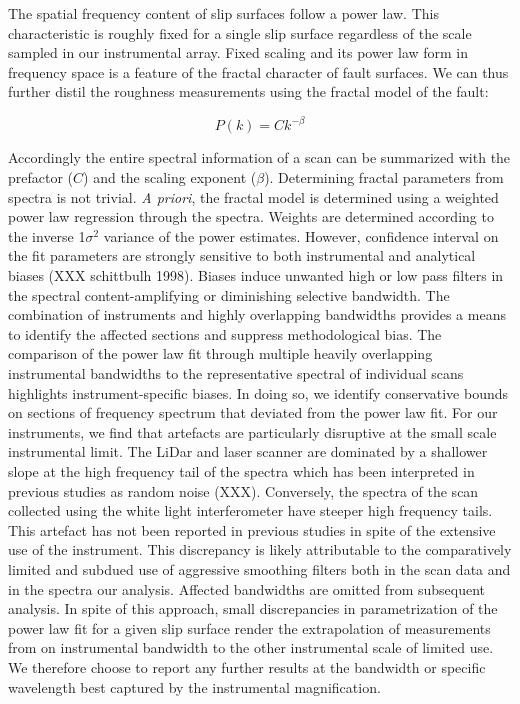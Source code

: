 \documentclass[12pt,a4paper]{article}
\begin{document}
The spatial frequency content of slip surfaces follow a power law. This characteristic is roughly fixed for a single slip surface regardless of the scale sampled in our instrumental array. Fixed scaling and its power law form in frequency space is a feature of the fractal character of fault surfaces. We can thus further distil the roughness measurements using the fractal model of the fault:

\begin{equation}
P(k) = Ck^{-\beta}
\end{equation}

Accordingly the entire spectral information of a scan can be summarized with the prefactor ($C$) and the scaling exponent ($\beta$). Determining fractal parameters from spectra is not trivial. \textit{A priori}, the fractal model is determined using a weighted power law regression through the spectra. Weights are determined according to the inverse 1$\sigma^2$ variance of the power estimates. However, confidence interval on the fit parameters are strongly sensitive to both instrumental and analytical biases (XXX schittbulh 1998). Biases induce unwanted high or low pass filters in the spectral content-amplifying or diminishing selective bandwidth. The combination of instruments and highly overlapping bandwidths provides a means to identify the affected sections and suppress methodological bias. The comparison of the power law fit through multiple heavily overlapping instrumental bandwidths to the representative spectral of individual scans highlights instrument-specific biases. In doing so, we identify conservative bounds on sections of frequency spectrum that deviated from the power law fit. For our instruments, we find that artefacts are particularly disruptive at the small scale instrumental limit. The LiDar and laser scanner are dominated by a shallower slope at the high frequency tail of the spectra which has been interpreted in previous studies as random noise (XXX). Conversely, the spectra of the scan collected using the white light interferometer have steeper high frequency tails. This artefact has not been reported in previous studies in spite of the extensive use of the instrument. This discrepancy is likely attributable to the comparatively limited and subdued use of aggressive smoothing filters both in the scan data and in the spectra our analysis. Affected bandwidths are omitted from subsequent analysis. In spite of this approach, small discrepancies in parametrization of the power law fit for a given slip surface render the extrapolation of measurements from on instrumental bandwidth to the other instrumental scale of limited use. We therefore choose to report any further results at the bandwidth or specific wavelength best captured by the instrumental magnification.
	
\end{document}
